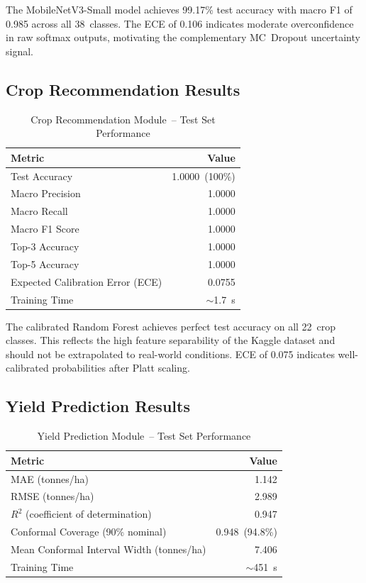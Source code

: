 \documentclass[12pt,a4paper]{report}
\begin{document}
The MobileNetV3-Small model achieves 99.17\% test accuracy with macro F1 of 0.985 across all 38~classes. The ECE of 0.106 indicates moderate overconfidence in raw softmax outputs, motivating the complementary MC~Dropout uncertainty signal.

\subsection{Crop Recommendation Results}
\begin{table}[h!]
\centering
\renewcommand{\arraystretch}{1.3}
\caption{Crop Recommendation Module~-- Test Set Performance}
\label{tab:crop_results}
\begin{tabular}{|L{7.5cm}|r|}
\hline
\textbf{Metric} & \textbf{Value} \\
\hline
Test Accuracy & 1.0000~(100\%) \\
\hline
Macro Precision & 1.0000 \\
\hline
Macro Recall & 1.0000 \\
\hline
Macro F1 Score & 1.0000 \\
\hline
Top-3 Accuracy & 1.0000 \\
\hline
Top-5 Accuracy & 1.0000 \\
\hline
Expected Calibration Error (ECE) & 0.0755 \\
\hline
Training Time & $\sim$1.7~s \\
\hline
\end{tabular}
\end{table}

The calibrated Random Forest achieves perfect test accuracy on all 22~crop classes. This reflects the high feature separability of the Kaggle dataset and should not be extrapolated to real-world conditions. ECE of 0.075 indicates well-calibrated probabilities after Platt scaling.

\subsection{Yield Prediction Results}
\begin{table}[h!]
\centering
\renewcommand{\arraystretch}{1.3}
\caption{Yield Prediction Module~-- Test Set Performance}
\label{tab:yield_results}
\begin{tabular}{|L{7.5cm}|r|}
\hline
\textbf{Metric} & \textbf{Value} \\
\hline
MAE (tonnes/ha) & 1.142 \\
\hline
RMSE (tonnes/ha) & 2.989 \\
\hline
$R^2$ (coefficient of determination) & 0.947 \\
\hline
Conformal Coverage (90\% nominal) & 0.948~(94.8\%) \\
\hline
Mean Conformal Interval Width (tonnes/ha) & 7.406 \\
\hline
Training Time & $\sim$451~s \\
\hline
\end{tabular}
\end{table}
\end{document}
